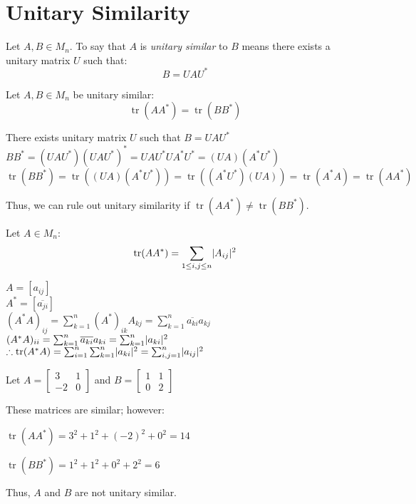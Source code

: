 \documentclass[letterpaper,12pt,fleqn]{article}
\DeclareMathOperator{\tr}{tr}
\newcommand{\conj}[1]{\overline{#1}}
\begin{document}
\section*{Unitary Similarity}

\begin{definition}
  Let $A,B\in M_n$. To say that $A$ is \emph{unitary similar} to $B$ means
  there exists a unitary matrix $U$ such that:
  \[B=UAU^*\]
\end{definition}

\begin{theorem}
  Let $A,B\in M_n$ be unitary similar:
  \[\tr(AA^*)=\tr(BB^*)\]
\end{theorem}

\begin{theproof}
  There exists unitary matrix $U$ such that $B=UAU^*$ \\
  $BB^*=(UAU^*)(UAU^*)^*=UAU^*UA^*U^*=(UA)(A^*U^*)$ \\
  $\tr(BB^*)=\tr((UA)(A^*U^*))=\tr((A^*U^*)(UA))=\tr(A^*A)=\tr(AA^*)$
\end{theproof}

Thus, we can rule out unitary similarity if $\tr(AA^*)\ne\tr(BB^*)$.

\begin{theorem}
  Let $A\in M_n$:
  \[\tr(AA^*)=\sum_{1\le i,j\le n}\abs{A_{ij}}^2\]
\end{theorem}

\begin{theproof}
  $A=[a_{ij}]$ \\
  $A^*=[\conj{a_{ji}}]$ \\
  $(A^*A)_{ij}=\sum_{k=1}^n(A^*)_{ik}A_{kj}=\sum_{k=1}^n\conj{a_{ki}}a_{kj}$ \\
  $(A^*A)_{ii}=\sum_{k=1}^n\conj{a_{ki}}a_{ki}=\sum_{k=1}^n\abs{a_{ki}}^2$ \\
  $\therefore\tr(A^*A)=\sum_{i=1}^n\sum_{k=1}^n\abs{a_{ki}}^2=
  \sum_{i,j=1}^n\abs{a_{ij}}^2$ \\
\end{theproof}

\begin{example}
  Let $A=\begin{bmatrix} 3 & 1 \\ -2 & 0 \end{bmatrix}$ and
  $B=\begin{bmatrix} 1 & 1 \\ 0 & 2 \end{bmatrix}$

  These matrices are similar; however:

  $\tr(AA^*)=3^2+1^2+(-2)^2+0^2=14$

  $\tr(BB^*)=1^2+1^2+0^2+2^2=6$

  Thus, $A$ and $B$ are not unitary similar.
\end{example}
\end{document}
